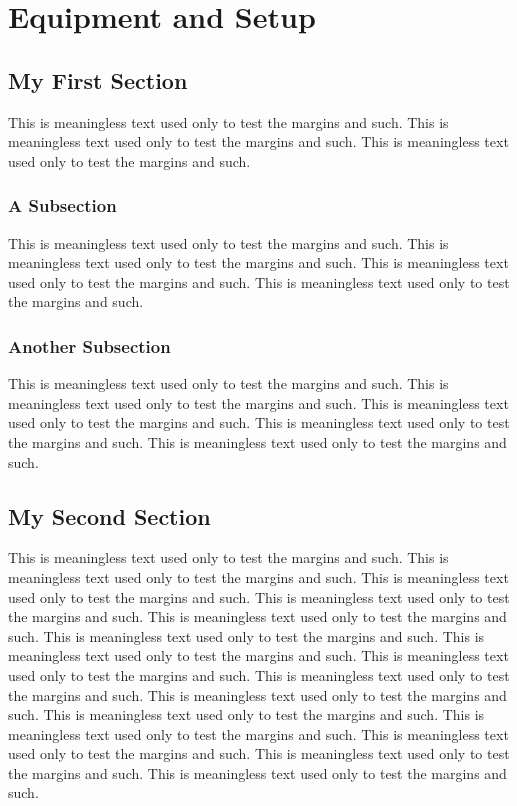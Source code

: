 
\chapter{Equipment and Setup}

\section{My First Section}

This is meaningless text used only to test the margins and such.
This is meaningless text used only to test the margins and such.
This is meaningless text used only to test the margins and such.
\subsection{A Subsection}
This is meaningless text used only to test the margins and such.
This is meaningless text used only to test the margins and such.
This is meaningless text used only to test the margins and such.
This is meaningless text used only to test the margins and such.
\subsection{Another Subsection}
This is meaningless text used only to test the margins and such.
This is meaningless text used only to test the margins and such.
This is meaningless text used only to test the margins and such.
This is meaningless text used only to test the margins and such.
This is meaningless text used only to test the margins and such.

\section{My Second Section}

This is meaningless text used only to test the margins and such.
This is meaningless text used only to test the margins and such.
This is meaningless text used only to test the margins and such.
This is meaningless text used only to test the margins and such.
This is meaningless text used only to test the margins and such.
This is meaningless text used only to test the margins and such.
This is meaningless text used only to test the margins and such.
This is meaningless text used only to test the margins and such.
This is meaningless text used only to test the margins and such.
This is meaningless text used only to test the margins and such.
This is meaningless text used only to test the margins and such.
This is meaningless text used only to test the margins and such.
This is meaningless text used only to test the margins and such.
This is meaningless text used only to test the margins and such.
This is meaningless text used only to test the margins and such.


